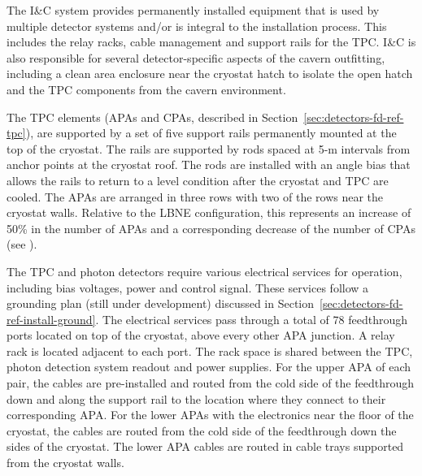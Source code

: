 The I\&C system provides 
permanently installed equipment that is used by multiple detector
systems and/or is integral to the installation process. This 
includes the relay racks, cable management and support rails for the TPC.
I\&C is also responsible for several detector-specific aspects of the cavern outfitting, including a clean area enclosure near the cryostat hatch to 
isolate  the open hatch and the TPC components
from the cavern environment. 



The TPC elements (APAs and CPAs, described in Section~\ref{sec:detectors-fd-ref-tpc}), are
supported by a set of five support rails permanently mounted at the
top of the cryostat. The rails are supported
by rods spaced at 5-m intervals from anchor points at the cryostat
roof. The rods are installed with an angle bias that allows the
rails to return to a level condition after the cryostat and TPC are
cooled. 
The APAs are arranged in three rows
with two of the rows near the cryostat walls. Relative to the LBNE configuration, 
this represents an
increase of 50\% in the number of APAs and a corresponding decrease of the number of
CPAs (see \anxlbnefd). 

The TPC and photon detectors require various electrical services
for operation, including bias voltages, power and control signal. These services
follow a grounding plan (still under development) 
discussed in Section~\ref{sec:detectors-fd-ref-install-ground}.  The
electrical services pass through a total of 78 feedthrough ports located on top of the
cryostat, above every other APA junction.  A relay rack is located
adjacent to each port. The rack space is shared between the TPC,
photon detection system readout and power supplies. For the upper APA of each pair,
the cables are pre-installed and routed from the cold side of the
feedthrough down and along the support rail to the location where they
connect to their corresponding APA. For the lower APAs with the
electronics near the floor of the cryostat, the cables are routed
from the cold side of the feedthrough down the sides of the
cryostat. The lower APA cables are routed in cable trays supported
from the cryostat walls.

